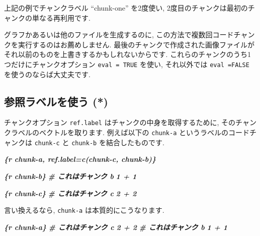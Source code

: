 \documentclass[
  11pt,
]{bxjsreport}
\newenvironment{Shaded}{\begin{snugshade}}{\end{snugshade}}
\newcommand{\InformationTok}[1]{\textcolor[rgb]{0.56,0.35,0.01}{\textbf{\textit{#1}}}}
\begin{document}
上記の例でチャンクラベル ``chunk-one'' を2度使い, 2度目のチャンクは最初のチャンクの単なる再利用です.

グラフかあるいは他のファイルを生成するのに, この方法で複数回コードチャンクを実行するのはお薦めしません. 最後のチャンクで作成された画像ファイルがそれ以前のものを上書きするかもしれないからです. これらのチャンクのうち1つだけにチャンクオプション \texttt{eval = TRUE} を使い, それ以外では \texttt{eval =FALSE} を使うのならば大丈夫です.

\hypertarget{ref-label}{%
\subsection{参照ラベルを使う (*)}\label{ref-label}}

チャンクオプション \texttt{ref.label} はチャンクの中身を取得するために, そのチャンクラベルのベクトルを取ります. 例えば以下の \texttt{chunk-a} というラベルのコードチャンクは \texttt{chunk-c} と \texttt{chunk-b} を結合したものです.

\begin{Shaded}
\begin{Highlighting}[]
\InformationTok{\textasciigrave{}\textasciigrave{}\textasciigrave{}\{r chunk{-}a, ref.label=c(\textquotesingle{}chunk{-}c\textquotesingle{}, \textquotesingle{}chunk{-}b\textquotesingle{})\}}
\InformationTok{\textasciigrave{}\textasciigrave{}\textasciigrave{}}

\InformationTok{\textasciigrave{}\textasciigrave{}\textasciigrave{}\{r chunk{-}b\}}
\InformationTok{\# これはチャンク b}
\InformationTok{1 + 1}
\InformationTok{\textasciigrave{}\textasciigrave{}\textasciigrave{}}

\InformationTok{\textasciigrave{}\textasciigrave{}\textasciigrave{}\{r chunk{-}c\}}
\InformationTok{\# これはチャンク c}
\InformationTok{2 + 2}
\InformationTok{\textasciigrave{}\textasciigrave{}\textasciigrave{}}
\end{Highlighting}
\end{Shaded}

言い換えるなら, \texttt{chunk-a} は本質的にこうなります.

\begin{Shaded}
\begin{Highlighting}[]
\InformationTok{\textasciigrave{}\textasciigrave{}\textasciigrave{}\{r chunk{-}a\}}
\InformationTok{\# これはチャンク c}
\InformationTok{2 + 2}
\InformationTok{\# これはチャンク b}
\InformationTok{1 + 1}
\InformationTok{\textasciigrave{}\textasciigrave{}\textasciigrave{}}
\end{Highlighting}
\end{Shaded}
\end{document}
